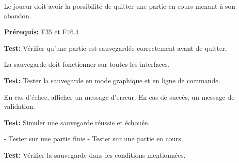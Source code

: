 \documentclass{article}
\begin{document}
\begin{needbox}
    \begin{subneedbox}
        Le joueur doit avoir la possibilité de quitter une partie en cours menant à son abandon.
    \end{subneedbox}

    \textbf{Prérequis:} F35 et F46.4

    \textbf{Test:} Vérifier qu'une partie est sauvegardée correctement avant de quitter.
\end{needbox}

\begin{needbox}
    \begin{subneedbox}
        La sauvegarde doit fonctionner sur toutes les interfaces.

        \textbf{Test:} Tester la sauvegarde en mode graphique et en ligne de commande.
    \end{subneedbox}
    
    \begin{subneedbox}
        En cas d’échec, afficher un message d’erreur. En cas de succès, un message de validation.

        \textbf{Test:} Simuler une sauvegarde réussie et échouée.
    \end{subneedbox}
    
    \begin{subneedbox}[F35.3: Tests]
        - Tester sur une partie finie
        - Tester sur une partie en cours.

        \textbf{Test:} Vérifier la sauvegarde dans les conditions mentionnées.
    \end{subneedbox}
\end{needbox}
\end{document}
